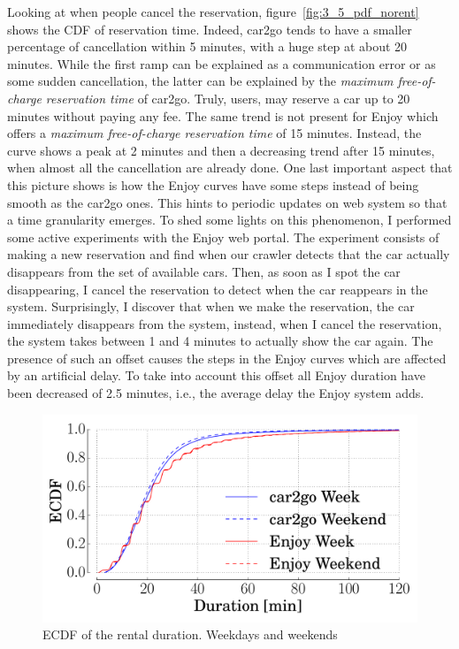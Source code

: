 Looking at when people cancel the reservation, figure~\ref{fig:3_5_pdf_norent} shows the CDF of reservation time. Indeed, car2go tends to have a smaller percentage of cancellation within 5 minutes, with a huge step at about 20 minutes. While the first ramp can be explained as a communication error or as some sudden cancellation, the latter can be explained by the \textit{maximum free-of-charge reservation time} of car2go. Truly, users, may reserve a car up to 20 minutes without paying any fee. The same trend is not present for Enjoy which offers a \textit{maximum free-of-charge reservation time} of 15 minutes. Instead, the curve shows a peak at 2 minutes and then a decreasing trend after 15 minutes, when almost all the cancellation are already done.
One last important aspect that this picture shows is how the Enjoy curves have some steps instead of being smooth as the car2go ones. 
This hints to periodic updates on web system so that a time granularity emerges.
To shed some lights on this phenomenon, I performed some active experiments with the Enjoy web portal. The experiment consists of making a new reservation and find when our crawler detects that the car actually disappears from the set of available cars. Then, as soon as I spot the car disappearing, I cancel the reservation to detect when the car reappears in the system. Surprisingly, I discover that when we make the reservation, the car immediately disappears from the system, instead, when I cancel the reservation, the system takes between 1 and 4 minutes to actually show the car again. The presence of such an offset causes the steps in the Enjoy curves which are affected by an artificial delay. To take into account this offset all Enjoy duration have been decreased of 2.5 minutes, i.e., the average delay the Enjoy system adds. 


\begin{figure}
	\centering
	\includegraphics[width=0.85\columnwidth]{figures/duration.pdf}
	\caption{ECDF of the rental duration. Weekdays and weekends\label{fig:3_5_cdf_duration}}
\end{figure}


